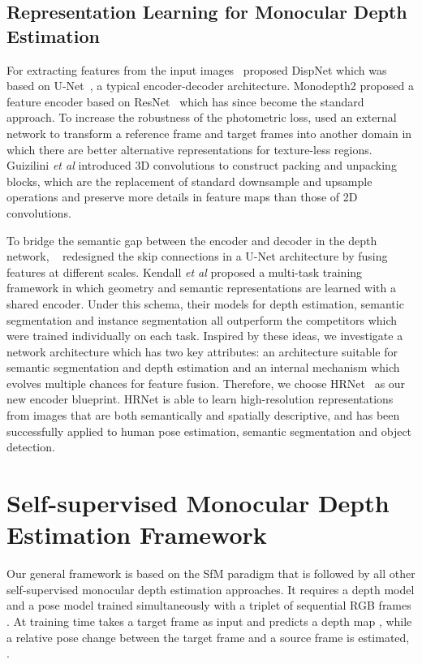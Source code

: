 \documentclass{bmvc2k}
\def\etal{\emph{et al}\bmvaOneDot}
\begin{document}
\subsection{Representation Learning for Monocular Depth Estimation}
 For extracting features from the input images~\cite{zhou_sfmlearner} proposed DispNet which was based on U-Net~\cite{Unet}, a typical encoder-decoder architecture.
 Monodepth2 \cite{monodepth2} proposed a feature encoder based on ResNet~\cite{he2016deep} which has since become the standard approach.
To increase the robustness of the photometric loss, \cite{shu2020feature} used an external network to transform a reference frame and target frames into another domain in which there are better alternative representations for texture-less regions. Guizilini \etal \cite{guizilini2020} introduced 3D convolutions to construct packing and unpacking blocks, which are the replacement of standard downsample and upsample operations and preserve more details in feature maps than those of 2D convolutions.
 
To bridge the semantic gap between the encoder and decoder in the depth network, ~\cite{lyu2020hr} redesigned the skip connections in a U-Net architecture by fusing features at different scales.
Kendall \etal \cite{kendall2018multi} proposed a multi-task training framework in which geometry and semantic representations are learned with a shared encoder.
Under this schema, their models for depth estimation, semantic segmentation and instance segmentation all outperform the competitors which were trained individually on each task. 
Inspired by these ideas, we investigate a network architecture which has two key attributes: an architecture suitable for semantic segmentation and depth estimation and an internal mechanism which evolves multiple chances for feature fusion. Therefore, we choose HRNet~\cite{hrnet2020} as our new encoder blueprint. HRNet is able to learn high-resolution representations from images that are both semantically and spatially descriptive, and has been successfully applied to human pose estimation, semantic segmentation and object detection.  


\section{Self-supervised Monocular Depth Estimation Framework}
Our general framework is based on the SfM paradigm that is followed by all other self-supervised monocular depth estimation approaches. It requires a depth model  and a pose model  trained simultaneously with a triplet of sequential RGB frames . At training time  takes a target frame  as input and predicts a depth map , while a relative pose change between the target frame and a source frame is estimated, . 
\end{document}
